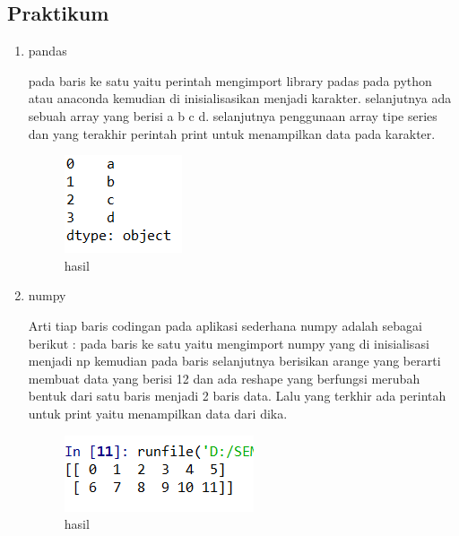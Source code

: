 \subsection{Praktikum}
\begin{enumerate}
\item pandas \par
pada baris ke satu yaitu perintah mengimport library padas pada python atau anaconda kemudian di inisialisasikan menjadi karakter. selanjutnya ada sebuah array yang berisi a b c d. selanjutnya penggunaan array tipe series dan yang terakhir perintah print untuk menampilkan data pada karakter.

\begin{figure}[ht]
\centering
\includegraphics[scale=0.5]{figures/1174050/chapter3/4.PNG}
\caption{hasil}
\label{contoh}
\end{figure}

\item numpy\par
Arti tiap baris codingan pada aplikasi sederhana numpy adalah sebagai berikut : pada baris ke satu yaitu mengimport numpy yang di inisialisasi menjadi np kemudian pada baris selanjutnya berisikan arange yang berarti membuat data yang berisi 12 dan ada reshape yang berfungsi merubah bentuk dari satu baris menjadi 2 baris data. Lalu yang terkhir ada perintah untuk print yaitu menampilkan data dari dika.

\begin{figure}[ht]
\centering
\includegraphics[scale=0.5]{figures/1174050/chapter3/5.PNG}
\caption{hasil}
\label{contoh}
\end{figure}


\end{enumerate}
